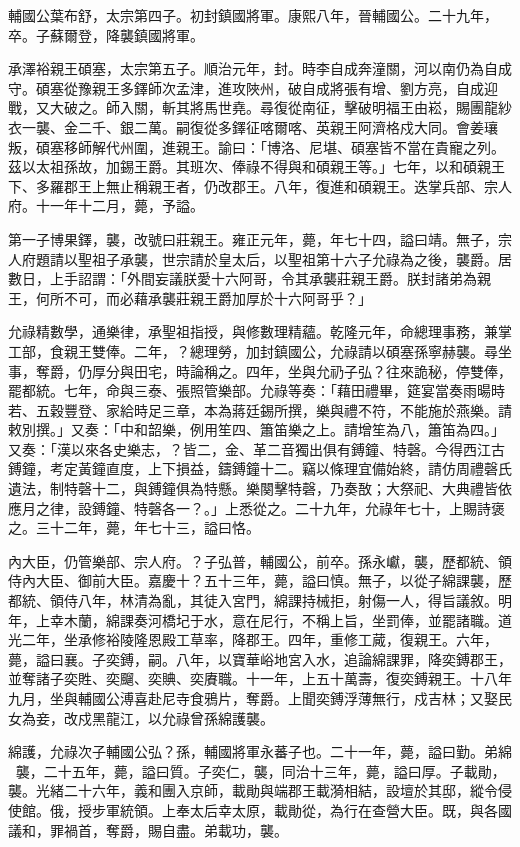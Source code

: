 \begin{pinyinscope}
輔國公葉布舒，太宗第四子。初封鎮國將軍。康熙八年，晉輔國公。二十九年，卒。子蘇爾登，降襲鎮國將軍。

承澤裕親王碩塞，太宗第五子。順治元年，封。時李自成奔潼關，河以南仍為自成守。碩塞從豫親王多鐸師次孟津，進攻陜州，破自成將張有增、劉方亮，自成迎戰，又大破之。師入關，斬其將馬世堯。尋復從南征，擊破明福王由崧，賜團龍紗衣一襲、金二千、銀二萬。嗣復從多鐸征喀爾喀、英親王阿濟格戍大同。會姜瓖叛，碩塞移師解代州圍，進親王。諭曰：「博洛、尼堪、碩塞皆不當在貴寵之列。茲以太祖孫故，加錫王爵。其班次、俸祿不得與和碩親王等。」七年，以和碩親王下、多羅郡王上無止稱親王者，仍改郡王。八年，復進和碩親王。迭掌兵部、宗人府。十一年十二月，薨，予謚。

第一子博果鐸，襲，改號曰莊親王。雍正元年，薨，年七十四，謚曰靖。無子，宗人府題請以聖祖子承襲，世宗請於皇太后，以聖祖第十六子允祿為之後，襲爵。居數日，上手詔謂：「外間妄議朕愛十六阿哥，令其承襲莊親王爵。朕封諸弟為親王，何所不可，而必藉承襲莊親王爵加厚於十六阿哥乎？」

允祿精數學，通樂律，承聖祖指授，與修數理精蘊。乾隆元年，命總理事務，兼掌工部，食親王雙俸。二年，？總理勞，加封鎮國公，允祿請以碩塞孫寧赫襲。尋坐事，奪爵，仍厚分與田宅，時論稱之。四年，坐與允礽子弘？往來詭秘，停雙俸，罷都統。七年，命與三泰、張照管樂部。允祿等奏：「藉田禮畢，筵宴當奏雨暘時若、五穀豐登、家給時足三章，本為蔣廷錫所撰，樂與禮不符，不能施於燕樂。請敕別撰。」又奏：「中和韶樂，例用笙四、簫笛樂之上。請增笙為八，簫笛為四。」又奏：「漢以來各史樂志，？皆二，金、革二音獨出俱有鎛鐘、特磬。今得西江古鎛鐘，考定黃鐘直度，上下損益，鑄鎛鐘十二。竊以條理宜備始終，請仿周禮磬氏遺法，制特磬十二，與鎛鐘俱為特懸。樂闋擊特磬，乃奏敔；大祭祀、大典禮皆依應月之律，設鎛鐘、特磬各一？。」上悉從之。二十九年，允祿年七十，上賜詩褒之。三十二年，薨，年七十三，謚曰恪。

內大臣，仍管樂部、宗人府。？子弘普，輔國公，前卒。孫永巘，襲，歷都統、領侍內大臣、御前大臣。嘉慶十？五十三年，薨，謚曰慎。無子，以從子綿課襲，歷都統、領侍八年，林清為亂，其徒入宮門，綿課持械拒，射傷一人，得旨議敘。明年，上幸木蘭，綿課奏河橋圮于水，意在尼行，不稱上旨，坐罰俸，並罷諸職。道光二年，坐承修裕陵隆恩殿工草率，降郡王。四年，重修工蕆，復親王。六年，薨，謚曰襄。子奕鎛，嗣。八年，以寶華峪地宮入水，追論綿課罪，降奕鎛郡王，並奪諸子奕貹、奕飀、奕賟、奕賡職。十一年，上五十萬壽，復奕鎛親王。十八年九月，坐與輔國公溥喜赴尼寺食鴉片，奪爵。上聞奕鎛浮薄無行，戍吉林；又娶民女為妾，改戍黑龍江，以允祿曾孫綿護襲。

綿護，允祿次子輔國公弘？孫，輔國將軍永蕃子也。二十一年，薨，謚曰勤。弟綿，襲，二十五年，薨，謚曰質。子奕仁，襲，同治十三年，薨，謚曰厚。子載勛，襲。光緒二十六年，義和團入京師，載勛與端郡王載漪相結，設壇於其邸，縱令侵使館。俄，授步軍統領。上奉太后幸太原，載勛從，為行在查營大臣。既，與各國議和，罪禍首，奪爵，賜自盡。弟載功，襲。


\end{pinyinscope}
